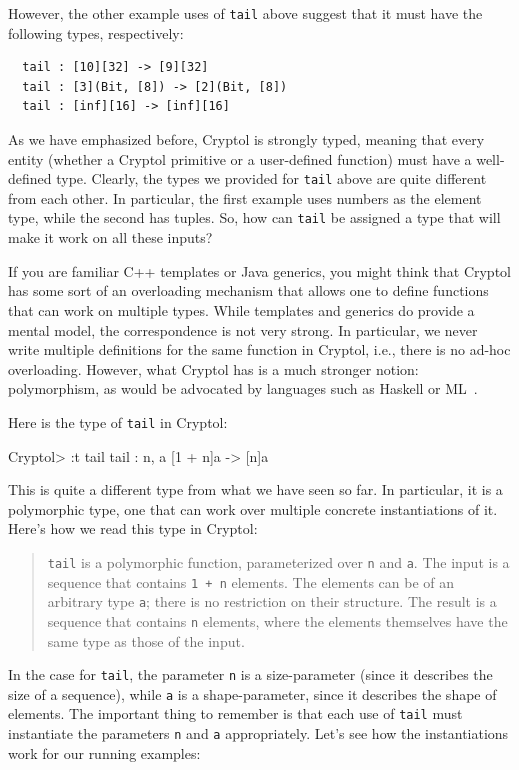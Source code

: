 However, the other example uses of {\tt tail} above suggest that it
must have the following types, respectively:
\begin{Verbatim}
  tail : [10][32] -> [9][32]
  tail : [3](Bit, [8]) -> [2](Bit, [8])
  tail : [inf][16] -> [inf][16]
\end{Verbatim}

As we have emphasized before, Cryptol is strongly typed, meaning that
every entity (whether a Cryptol primitive or a user-defined function)
must have a well-defined type. Clearly, the types we provided for
\texttt{tail} above are quite different from each other. In particular, the
first example uses numbers as the element type, while the second has
tuples. So, how can \texttt{tail} be assigned a type that will make it
work on all these inputs?

If you are familiar C++ templates or Java generics, you might think
that Cryptol has some sort of an overloading mechanism that allows one
to define functions that can work on multiple types. While templates
and generics do provide a mental model, the correspondence is not very
strong. In particular, we never write multiple definitions for the
same function in Cryptol, i.e., there is no ad-hoc
overloading. However, what Cryptol has is a much stronger notion:
polymorphism, as would be advocated by languages such as Haskell or
ML~\cite{ML,Has98}.\indPolymorphism\indOverloading

Here is the type of {\tt tail} in Cryptol:
\restartrepl
\begin{replPrompt}
  Cryptol> :t tail
  tail : {n, a} [1 + n]a -> [n]a
\end{replPrompt}
This is quite a different type from what we have seen so far. In
particular, it is a polymorphic type, one that can work over multiple
concrete instantiations of it. Here's how we read this type in
Cryptol:
\begin{quote} \texttt{tail} is a polymorphic function, parameterized over
  \texttt{n} and \texttt{a}. The input is a sequence that contains
  \texttt{1 + n} elements. The elements can be of an arbitrary type
  \texttt{a}; there is no restriction on their structure. The result
  is a sequence that contains \texttt{n} elements, where the elements
  themselves have the same type as those of the input.
\end{quote}
In the case for \texttt{tail}, the parameter \texttt{n} is a size-parameter
(since it describes the size of a sequence), while \texttt{a} is a
shape-parameter, since it describes the shape of elements. The
important thing to remember is that each use of \texttt{tail} must
instantiate the parameters \texttt{n} and \texttt{a} appropriately. Let's
see how the instantiations work for our running examples:

